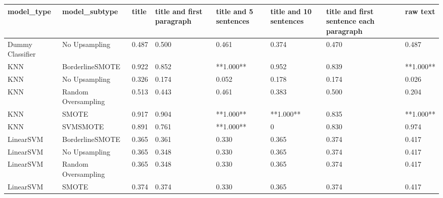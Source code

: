 \begin{tabular}{llllllll}
\toprule
                  model\_type &       model\_subtype & title & title and first paragraph & title and 5 sentences & title and 10 sentences & title and first sentence each paragraph &  raw text \\
\midrule
            Dummy Classifier &       No Upsampling & 0.487 &                     0.500 &                 0.461 &                  0.374 &                                   0.470 &     0.487 \\
                         KNN &     BorderlineSMOTE & 0.922 &                     0.852 &             **1.000** &                  0.952 &                                   0.839 & **1.000** \\
                         KNN &       No Upsampling & 0.326 &                     0.174 &                 0.052 &                  0.178 &                                   0.174 &     0.026 \\
                         KNN & Random Oversampling & 0.513 &                     0.443 &                 0.461 &                  0.383 &                                   0.500 &     0.204 \\
                         KNN &               SMOTE & 0.917 &                     0.904 &             **1.000** &              **1.000** &                                   0.835 & **1.000** \\
                         KNN &            SVMSMOTE & 0.891 &                     0.761 &             **1.000** &                      0 &                                   0.830 &     0.974 \\
                   LinearSVM &     BorderlineSMOTE & 0.365 &                     0.361 &                 0.330 &                  0.365 &                                   0.374 &     0.417 \\
                   LinearSVM &       No Upsampling & 0.365 &                     0.348 &                 0.330 &                  0.365 &                                   0.374 &     0.417 \\
                   LinearSVM & Random Oversampling & 0.365 &                     0.348 &                 0.330 &                  0.365 &                                   0.374 &     0.417 \\
                   LinearSVM &               SMOTE & 0.374 &                     0.374 &                 0.330 &                  0.365 &                                   0.374 &     0.417 \\

\end{tabular}
